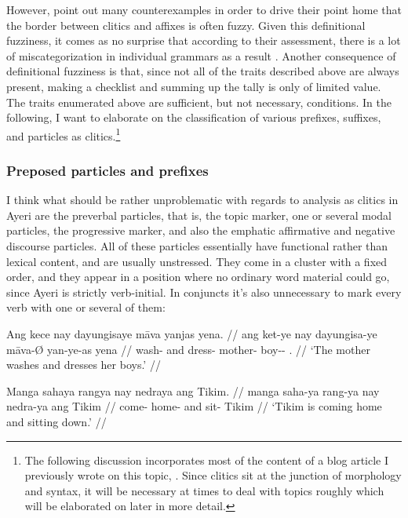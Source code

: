 However, \citet{spencerluis2012} point out many counterexamples in order to 
drive their point home that the border between clitics and affixes is often 
fuzzy. Given this definitional fuzziness, it comes as no surprise that 
according to their assessment, there is a lot of miscategorization in 
individual grammars as a result \citep[107]{spencerluis2012}. Another 
consequence of definitional fuzziness is that, since not all of the traits 
described above are always present, making a checklist and summing up the 
tally is only of limited value. The traits enumerated above are sufficient, 
but not necessary, conditions. In the following, I want to elaborate on the 
classification of various prefixes, suffixes, and particles as 
clitics.\footnote{The following discussion incorporates most of the content of 
a blog article I previously wrote on this topic, \citet{benung:clitics}. Since
clitics sit at the junction of morphology and syntax, it will be necessary at
times to deal with topics roughly which will be elaborated on later in more
detail.}

\subsubsection{Preposed particles and prefixes}

I think what should be rather unproblematic with regards to analysis as clitics
in Ayeri are the preverbal particles, that is, the topic marker, one or several
modal particles, the progressive marker, and also the emphatic affirmative and
negative discourse particles. All of these particles essentially have
functional rather than lexical content, and are usually unstressed. They come
in a cluster with a fixed order, and they appear in a position where no
ordinary word material could go, since Ayeri is strictly verb-initial. In
conjuncts it's also unnecessary to mark every verb with one or several of them:

\pex
\a\label{ex:clitics_1a}\begingl
	\gla Ang kece nay dayungisaye māva yanjas yena. //
	\glb ang ket-ye nay dayungisa-ye māva-Ø yan-ye-as yena //
	\glc \AgtT{} wash-\TsgF{} and dress-\TsgF{} mother-\Top{} boy-\Pl{}-\Parg{}
		\TsgF{}.\Gen{} //
	\glft `The mother washes and dresses her boys.' //
\endgl

\a\label{ex:clitics_1b}\begingl
	\gla Manga sahaya rangya nay nedraya ang Tikim. //
	\glb manga saha-ya rang-ya nay nedra-ya ang Tikim //
	\glc \Prog{} come-\TsgM{} home-\Loc{} and sit-\TsgM{} \Aarg{} Tikim //
	\glft `Tikim is coming home and sitting down.' //
\endgl


